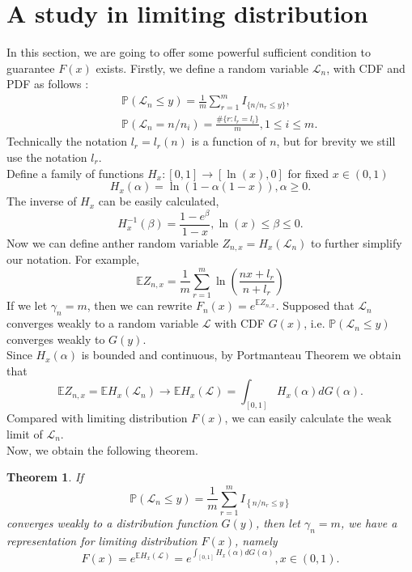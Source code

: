 \documentclass[12pt]{article}
\theoremstyle{plain}
\newtheorem{thm}{\textbf{Theorem}}
\theoremstyle{definition}
\theoremstyle{remark}
\begin{document}
\section{A study in limiting distribution}\label{sec: a study in gamma}
In this section, we are going to offer some powerful sufficient condition to guarantee $F(x)$ exists.
Firstly, we define a random variable $\mathscr{L}_n$, with CDF and PDF as follows :
\begin{eqnarray*}
	&&\mathbb{P}(\mathscr{L}_n \leq y )=\frac{1}{m}\sum_{r=1}^{m}I_{\{n/n_r\leq y\}},\\
	&&\mathbb{P}(\mathscr{L}_n = n/n_i )=\frac{\#\{r:l_r=l_i\}}{m},1\leq i\leq m.
\end{eqnarray*}
Technically the notation $l_r=l_r(n)$ is a function of $n$, but for brevity we still use the notation $l_r$.\\
Define a family of functions $H_x:[0,1]\rightarrow[\ln (x),0]$ for fixed $x\in (0,1)$
\begin{equation*}
	H_{x}(\alpha)=\ln(1-\alpha (1-x)),\alpha \geq 0.
\end{equation*}
The inverse of $H_{x}$ can be easily calculated,
\begin{equation*}
	H^{-1}_{x}(\beta)=\dfrac{1-e^ \beta}{1-x} ,\ln(x)\leq \beta\leq0.
\end{equation*}
Now we can define anther random variable $Z_{n,x}=H_{x}(\mathscr{L}_n)$ to further simplify our notation. For example, 
\begin{equation*}
	\mathbb {E}Z_{n,x}=\frac{1}{m} \sum_{r=1}^{m} \ln \left(\frac{n x+l_{r}}{n+l_{r}}\right)
\end{equation*}
If we let $\gamma_{n}=m$, then we can rewrite $F_n(x)=e^{\mathbb{E}Z_{n,x}}$.
Supposed that $\mathscr{L}_n$ converges weakly to a random variable $\mathscr{L}$ with CDF $G(x)$, i.e. $\mathbb{P}(\mathscr{L}_n \leq y )$ converges weakly to $G(y)$.\\
Since $H_{x}(\alpha)$ is bounded and continuous, by Portmanteau Theorem we obtain that 
\begin{equation*}
	\mathbb{E}Z_{n,x}=\mathbb{E}H_{x}(\mathscr{L}_n)\to \mathbb{E}H_{x}(\mathscr{L})=\int_{[0,1]}H_{x}(\alpha)dG(\alpha).
\end{equation*}
Compared with limiting distribution $F(x)$, we can easily calculate the weak limit of $\mathscr{L}_n$.\\
Now, we obtain the following theorem.
\begin{thm}\label{thm5}
	If 
	\begin{equation*}
		\mathbb{P}\left(\mathscr{L}_{n} \leqslant y\right)=\frac{1}{m} \sum_{r=1}^{m} I_{\left\{n/n_{r}  \leqslant y\right\}}
	\end{equation*}
	converges weakly to a distribution function $G(y)$, then let $\gamma_{n}=m$, we have a representation for limiting distribution $F(x)$, namely
	\begin{equation}\label{Def_L_n}
	F(x)=e^{\mathbb{E}H_{x}(\mathscr{L})}=e^{\int_{[0,1]}H_x(\alpha)dG(\alpha)},x\in (0,1).
	\end{equation} 
\end{thm}
\end{document}
